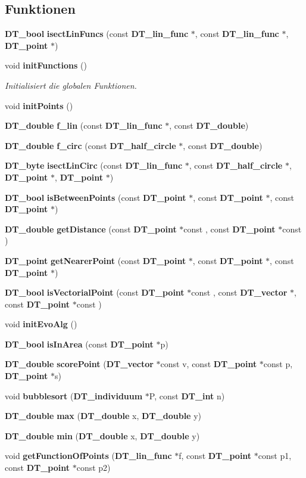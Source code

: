 \subsection*{Funktionen}
\begin{DoxyCompactItemize}
\item 
{\bf DT\_\-bool} {\bf isectLinFuncs} (const {\bf DT\_\-lin\_\-func} $\ast$, const {\bf DT\_\-lin\_\-func} $\ast$, {\bf DT\_\-point} $\ast$)
\item 
void {\bf initFunctions} ()
\begin{DoxyCompactList}\small\item\em Initialisiert die globalen Funktionen. \item\end{DoxyCompactList}\item 
void {\bf initPoints} ()
\item 
{\bf DT\_\-double} {\bf f\_\-lin} (const {\bf DT\_\-lin\_\-func} $\ast$, const {\bf DT\_\-double})
\item 
{\bf DT\_\-double} {\bf f\_\-circ} (const {\bf DT\_\-half\_\-circle} $\ast$, const {\bf DT\_\-double})
\item 
{\bf DT\_\-byte} {\bf isectLinCirc} (const {\bf DT\_\-lin\_\-func} $\ast$, const {\bf DT\_\-half\_\-circle} $\ast$, {\bf DT\_\-point} $\ast$, {\bf DT\_\-point} $\ast$)
\item 
{\bf DT\_\-bool} {\bf isBetweenPoints} (const {\bf DT\_\-point} $\ast$, const {\bf DT\_\-point} $\ast$, const {\bf DT\_\-point} $\ast$)
\item 
{\bf DT\_\-double} {\bf getDistance} (const {\bf DT\_\-point} $\ast$const , const {\bf DT\_\-point} $\ast$const )
\item 
{\bf DT\_\-point} {\bf getNearerPoint} (const {\bf DT\_\-point} $\ast$, const {\bf DT\_\-point} $\ast$, const {\bf DT\_\-point} $\ast$)
\item 
{\bf DT\_\-bool} {\bf isVectorialPoint} (const {\bf DT\_\-point} $\ast$const , const {\bf DT\_\-vector} $\ast$, const {\bf DT\_\-point} $\ast$const )
\item 
void {\bf initEvoAlg} ()
\item 
{\bf DT\_\-bool} {\bf isInArea} (const {\bf DT\_\-point} $\ast$p)
\item 
{\bf DT\_\-double} {\bf scorePoint} ({\bf DT\_\-vector} $\ast$const v, const {\bf DT\_\-point} $\ast$const p, {\bf DT\_\-point} $\ast$s)
\item 
void {\bf bubblesort} ({\bf DT\_\-individuum} $\ast$P, const {\bf DT\_\-int} n)
\item 
{\bf DT\_\-double} {\bf max} ({\bf DT\_\-double} x, {\bf DT\_\-double} y)
\item 
{\bf DT\_\-double} {\bf min} ({\bf DT\_\-double} x, {\bf DT\_\-double} y)
\item 
void {\bf getFunctionOfPoints} ({\bf DT\_\-lin\_\-func} $\ast$f, const {\bf DT\_\-point} $\ast$const p1, const {\bf DT\_\-point} $\ast$const p2)
\end{DoxyCompactItemize}
